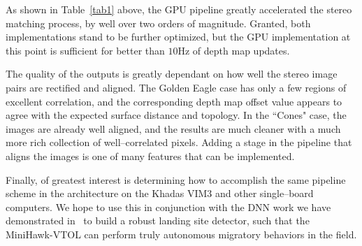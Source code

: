 \documentclass[runningheads]{llncs}
\begin{document}
As shown in Table~\ref{tab1} above, the GPU pipeline greatly accelerated the stereo matching process, by well over two orders of magnitude. Granted, both implementations stand to be further optimized, but the GPU implementation at this point is sufficient for better than $10$Hz of depth map updates.

The quality of the outputs is greatly dependant on how well the stereo image pairs are rectified and aligned. The Golden Eagle case has only a few regions of excellent correlation, and the corresponding depth map offset value appears to agree with the expected surface distance and topology. In the ``Cones" case, the images are already well aligned, and the results are much cleaner with a much more rich collection of well--correlated pixels. Adding a stage in the pipeline that aligns the images is one of many features that can be implemented. 

Finally, of greatest interest is determining how to accomplish the same pipeline scheme in the architecture on the Khadas VIM3 and other single--board computers. We hope to use this in conjunction with the DNN work we have demonstrated in~\cite{arora2022deep} to build a robust landing site detector, such that the MiniHawk-VTOL can perform truly autonomous migratory behaviors in the field.





\end{document}

